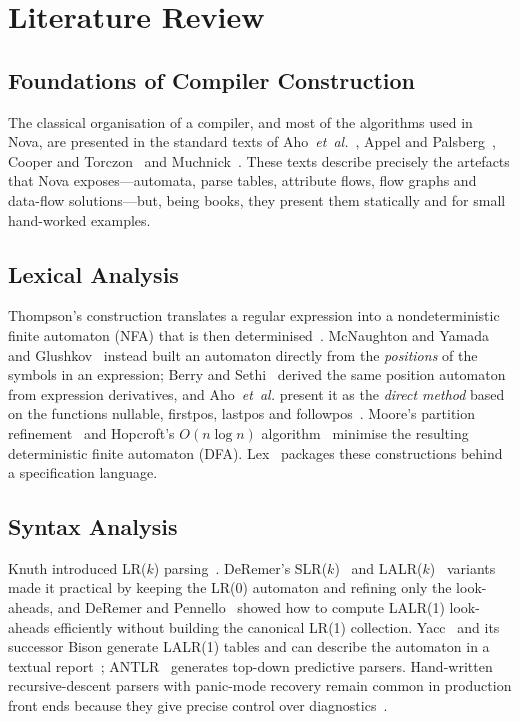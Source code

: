 \documentclass[conference]{IEEEtran}
\begin{document}
\section{Literature Review}
\label{sec:lit}

\subsection{Foundations of Compiler Construction}
The classical organisation of a compiler, and most of the algorithms used in Nova, are presented in the standard texts of Aho~\emph{et~al.}~\cite{aho2006}, Appel and Palsberg~\cite{appel2002}, Cooper and Torczon~\cite{cooper2011} and Muchnick~\cite{muchnick1997}. These texts describe precisely the artefacts that Nova exposes---automata, parse tables, attribute flows, flow graphs and data-flow solutions---but, being books, they present them statically and for small hand-worked examples.

\subsection{Lexical Analysis}
Thompson's construction translates a regular expression into a nondeterministic finite automaton (NFA) that is then determinised~\cite{thompson1968}. McNaughton and Yamada~\cite{mcnaughton1960} and Glushkov~\cite{glushkov1961} instead built an automaton directly from the \emph{positions} of the symbols in an expression; Berry and Sethi~\cite{berry1986} derived the same position automaton from expression derivatives, and Aho~\emph{et~al.} present it as the \emph{direct method} based on the functions nullable, firstpos, lastpos and followpos~\cite{aho2006}. Moore's partition refinement~\cite{moore1956} and Hopcroft's $O(n \log n)$ algorithm~\cite{hopcroft1971} minimise the resulting deterministic finite automaton (DFA). Lex~\cite{lesk1975} packages these constructions behind a specification language.

\subsection{Syntax Analysis}
Knuth introduced LR($k$) parsing~\cite{knuth1965}. DeRemer's SLR($k$)~\cite{deremer1971} and LALR($k$)~\cite{deremer1969} variants made it practical by keeping the LR(0) automaton and refining only the look-aheads, and DeRemer and Pennello~\cite{deremer1982} showed how to compute LALR(1) look-aheads efficiently without building the canonical LR(1) collection. Yacc~\cite{johnson1975} and its successor Bison generate LALR(1) tables and can describe the automaton in a textual report~\cite{bison}; ANTLR~\cite{parr1995} generates top-down predictive parsers. Hand-written recursive-descent parsers with panic-mode recovery remain common in production front ends because they give precise control over diagnostics~\cite{aho2006}.
\end{document}
